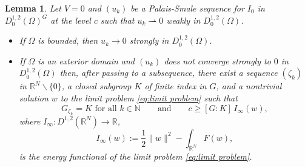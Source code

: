 \documentclass[10pt,letterpaper]{article}
\newtheorem{lemma}[theorem]{Lemma}
\numberwithin{equation}{section}
\def\r{\mathbb{R}}
\def\rn{\mathbb{R}^N}
\def\rh{\rightharpoonup}
\def\irn{\int_{\r^N}}
\def\o{\Omega}
\begin{document}
\begin{lemma}\label{lem:spliting} 
Let $V=0$ and $(u_k)$ be a Palais-Smale sequence for $I_0$ in $D^{1,2}_0(\o)^G$ at the level $c$ such that  $u_k\rh 0$ weakly in $D^{1,2}_0(\o)$. 
\begin{itemize}
\item[$(a)$] If $\o$ is bounded, then $u_k\to 0$ strongly in $D^{1,2}_0(\o)$. 
\item[$(b)$] If $\o$ is an exterior domain and $(u_k)$ does not converge strongly to $0$ in $D^{1,2}_0(\o)$ then, after passing to a subsequence, there exist a sequence $(\zeta_k)$ in $\rn\smallsetminus\{0\}$, a closed subgroup $K$ of finite index in $G$, and a nontrivial solution $w$ to the limit problem \eqref{eq:limit problem} such that
$$G_{\zeta_k}= K\text{ \ for all \ }k \in \mathbb{N}\qquad\text{and}\qquad c\geq[G:K] \, I_{\infty}(w),$$ 
where $I_\infty:D^{1,2}(\rn)\to\r$,
$$I_\infty(w):=\frac{1}{2}\|w\|^2-\irn F(w),$$
is the energy functional of the limit problem \eqref{eq:limit problem}.  
\end{itemize}
\end{lemma}
\end{document}
